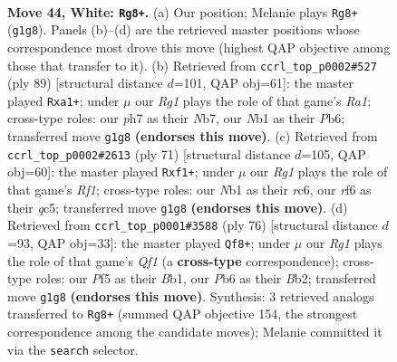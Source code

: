 \documentclass[11pt]{article}
\begin{document}
\clearpage

\begin{figure}[p]\centering
\begin{subfigure}{0.46\textwidth}\centering
\resizebox{\linewidth}{!}{%
\newchessgame
\chessboard[
  setfen={2b1k3/p2n3p/1P3r1B/4qP2/1p1pQ3/8/p3P3/1N1K2R1 w - - 0 44},
  showmover=false,
  pgfstyle=straightmove, color=movearrow, markmove={g1-g8}
]}
\caption{}
\end{subfigure}\hfill
\begin{subfigure}{0.46\textwidth}\centering
\resizebox{\linewidth}{!}{%
\newchessgame
\chessboard[
  setfen={r5k1/1n4p1/1p3qR1/3PN2Q/2P2P1P/3p4/7P/R6K b - - 0 45},
  showmover=false,
  pgfstyle=straightmove, color=movearrow, markmove={a8-a1}
]}
\caption{}
\end{subfigure}
\\[4pt]
\begin{subfigure}{0.46\textwidth}\centering
\resizebox{\linewidth}{!}{%
\newchessgame
\chessboard[
  setfen={5r2/7k/2R3p1/1pQb3p/1P2p2P/4P1q1/6R1/5BK1 b - - 1 36},
  showmover=false,
  pgfstyle=straightmove, color=movearrow, markmove={f8-f1}
]}
\caption{}
\end{subfigure}\hfill
\begin{subfigure}{0.46\textwidth}\centering
\resizebox{\linewidth}{!}{%
\newchessgame
\chessboard[
  setfen={7k/1p5p/p7/3pb3/1P1nP1r1/P6q/1B4P1/1B3QK1 w - - 0 39},
  showmover=false,
  pgfstyle=straightmove, color=movearrow, markmove={f1-f8}
]}
\caption{}
\end{subfigure}
\caption{\textbf{Move 44, White: \texttt{Rg8+}.} (a) Our position; Melanie plays \texttt{Rg8+} (\texttt{g1g8}). Panels (b)--(d) are the retrieved master positions whose correspondence most drove this move (highest QAP objective among those that transfer to it). (b) Retrieved from \texttt{ccrl\_top\_p0002\#527} (ply 89) [structural distance $d$=101, QAP obj=61]: the master played \texttt{Rxa1+}; under $\mu$ our \emph{Rg1} plays the role of that game's \emph{Ra1}; cross-type roles: our \emph{p}h7 as their \emph{N}b7, our \emph{N}b1 as their \emph{P}b6; transferred move \texttt{g1g8} \textbf{(endorses this move)}. (c) Retrieved from \texttt{ccrl\_top\_p0002\#2613} (ply 71) [structural distance $d$=105, QAP obj=60]: the master played \texttt{Rxf1+}; under $\mu$ our \emph{Rg1} plays the role of that game's \emph{Rf1}; cross-type roles: our \emph{N}b1 as their \emph{r}c6, our \emph{r}f6 as their \emph{q}c5; transferred move \texttt{g1g8} \textbf{(endorses this move)}. (d) Retrieved from \texttt{ccrl\_top\_p0001\#3588} (ply 76) [structural distance $d$=93, QAP obj=33]: the master played \texttt{Qf8+}; under $\mu$ our \emph{Rg1} plays the role of that game's \emph{Qf1} (a \textbf{cross-type} correspondence); cross-type roles: our \emph{P}f5 as their \emph{B}b1, our \emph{P}b6 as their \emph{B}b2; transferred move \texttt{g1g8} \textbf{(endorses this move)}. Synthesis: 3 retrieved analogs transferred to \texttt{Rg8+} (summed QAP objective 154, the strongest correspondence among the candidate moves); Melanie committed it via the \texttt{search} selector.}
\label{fig:thought-m86}
\end{figure}
\end{document}
